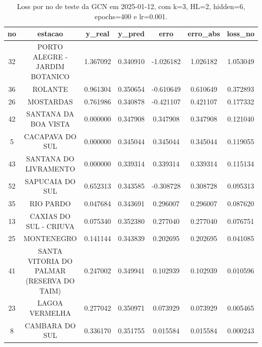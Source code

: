 \begin{table}[h]
\centering
\caption{Loss por no de teste da GCN em 2025-01-12, com k=3, HL=2, hidden=6, epochs=400 e lr=0.001.}
\label{tab:gcn_loss_k3_hl2_h6_e400_d20250112}
\begin{tabular}{ccccccc}
\toprule
no & estacao & y\_real & y\_pred & erro & erro\_abs & loss\_no \\
\midrule
32 & PORTO ALEGRE - JARDIM BOTANICO & 1.367092 & 0.340910 & -1.026182 & 1.026182 & 1.053049 \\
36 & ROLANTE & 0.961304 & 0.350654 & -0.610649 & 0.610649 & 0.372893 \\
26 & MOSTARDAS & 0.761986 & 0.340878 & -0.421107 & 0.421107 & 0.177332 \\
42 & SANTANA DA BOA VISTA & 0.000000 & 0.347908 & 0.347908 & 0.347908 & 0.121040 \\
5 & CACAPAVA DO SUL & 0.000000 & 0.345044 & 0.345044 & 0.345044 & 0.119055 \\
43 & SANTANA DO LIVRAMENTO & 0.000000 & 0.339314 & 0.339314 & 0.339314 & 0.115134 \\
52 & SAPUCAIA DO SUL & 0.652313 & 0.343585 & -0.308728 & 0.308728 & 0.095313 \\
35 & RIO PARDO & 0.047684 & 0.343691 & 0.296007 & 0.296007 & 0.087620 \\
13 & CAXIAS DO SUL - CRIUVA & 0.075340 & 0.352380 & 0.277040 & 0.277040 & 0.076751 \\
25 & MONTENEGRO & 0.141144 & 0.343839 & 0.202695 & 0.202695 & 0.041085 \\
41 & SANTA VITORIA DO PALMAR (RESERVA DO TAIM) & 0.247002 & 0.349941 & 0.102939 & 0.102939 & 0.010596 \\
23 & LAGOA VERMELHA & 0.277042 & 0.350971 & 0.073929 & 0.073929 & 0.005465 \\
8 & CAMBARA DO SUL & 0.336170 & 0.351755 & 0.015584 & 0.015584 & 0.000243 \\
\bottomrule
\end{tabular}
\end{table}
